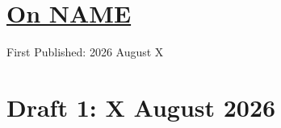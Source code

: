 \documentclass[12pt]{article}
\renewcommand{\,}{\textsuperscript{,}}
\renewcommand{\title}[2]{\section{\href{#1.html}{#2}}}
\newcommand{\published}[1]{First Published: #1}
\newcommand{\draft}[1]{\section{Draft #1}}
\begin{document}
\title{NAME}{On NAME}
\published{2026 August X}
\draft{1: X August 2026}

\end{document}
